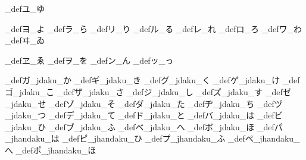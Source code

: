 \brl@char_def{ユ}{\brl@char@alias_ゆ}

\brl@char_def{ヨ}{\brl@char@alias_よ}
\brl@char_def{ラ}{\brl@char@alias_ら}
\brl@char_def{リ}{\brl@char@alias_り}
\brl@char_def{ル}{\brl@char@alias_る}
\brl@char_def{レ}{\brl@char@alias_れ}
\brl@char_def{ロ}{\brl@char@alias_ろ}
\brl@char_def{ワ}{\brl@char@alias_わ}
\brl@char_def{ヰ}{\brl@char@alias_ゐ}

\brl@char_def{ヱ}{\brl@char@alias_ゑ}
\brl@char_def{ヲ}{\brl@char@alias_を}
\brl@char_def{ン}{\brl@char@alias_ん}
\brl@char_def{ッ}{\brl@char@alias_っ}

\brl@char_def{ガ}{\brl@char@alias_jdaku\brl@char@alias_か}
\brl@char_def{ギ}{\brl@char@alias_jdaku\brl@char@alias_き}
\brl@char_def{グ}{\brl@char@alias_jdaku\brl@char@alias_く}
\brl@char_def{ゲ}{\brl@char@alias_jdaku\brl@char@alias_け}
\brl@char_def{ゴ}{\brl@char@alias_jdaku\brl@char@alias_こ}
\brl@char_def{ザ}{\brl@char@alias_jdaku\brl@char@alias_さ}
\brl@char_def{ジ}{\brl@char@alias_jdaku\brl@char@alias_し}
\brl@char_def{ズ}{\brl@char@alias_jdaku\brl@char@alias_す}
\brl@char_def{ゼ}{\brl@char@alias_jdaku\brl@char@alias_せ}
\brl@char_def{ゾ}{\brl@char@alias_jdaku\brl@char@alias_そ}
\brl@char_def{ダ}{\brl@char@alias_jdaku\brl@char@alias_た}
\brl@char_def{ヂ}{\brl@char@alias_jdaku\brl@char@alias_ち}
\brl@char_def{ヅ}{\brl@char@alias_jdaku\brl@char@alias_つ}
\brl@char_def{デ}{\brl@char@alias_jdaku\brl@char@alias_て}
\brl@char_def{ド}{\brl@char@alias_jdaku\brl@char@alias_と}
\brl@char_def{バ}{\brl@char@alias_jdaku\brl@char@alias_は}
\brl@char_def{ビ}{\brl@char@alias_jdaku\brl@char@alias_ひ}
\brl@char_def{ブ}{\brl@char@alias_jdaku\brl@char@alias_ふ}
\brl@char_def{ベ}{\brl@char@alias_jdaku\brl@char@alias_へ}
\brl@char_def{ボ}{\brl@char@alias_jdaku\brl@char@alias_ほ}
\brl@char_def{パ}{\brl@char@alias_jhandaku\brl@char@alias_は}
\brl@char_def{ピ}{\brl@char@alias_jhandaku\brl@char@alias_ひ}
\brl@char_def{プ}{\brl@char@alias_jhandaku\brl@char@alias_ふ}
\brl@char_def{ペ}{\brl@char@alias_jhandaku\brl@char@alias_へ}
\brl@char_def{ポ}{\brl@char@alias_jhandaku\brl@char@alias_ほ}

